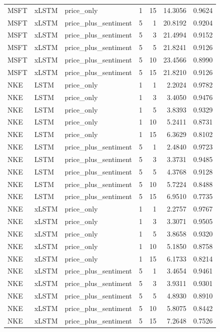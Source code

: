\begin{longtable}{lllrrrr}
MSFT & xLSTM & price_only & 1 & 15 & 14.3056 & 0.9624 \\
MSFT & xLSTM & price_plus_sentiment & 5 & 1 & 20.8192 & 0.9204 \\
MSFT & xLSTM & price_plus_sentiment & 5 & 3 & 21.4994 & 0.9152 \\
MSFT & xLSTM & price_plus_sentiment & 5 & 5 & 21.8241 & 0.9126 \\
MSFT & xLSTM & price_plus_sentiment & 5 & 10 & 23.4566 & 0.8990 \\
MSFT & xLSTM & price_plus_sentiment & 5 & 15 & 21.8210 & 0.9126 \\
NKE & LSTM & price_only & 1 & 1 & 2.2024 & 0.9782 \\
NKE & LSTM & price_only & 1 & 3 & 3.4050 & 0.9476 \\
NKE & LSTM & price_only & 1 & 5 & 3.8393 & 0.9329 \\
NKE & LSTM & price_only & 1 & 10 & 5.2411 & 0.8731 \\
NKE & LSTM & price_only & 1 & 15 & 6.3629 & 0.8102 \\
NKE & LSTM & price_plus_sentiment & 5 & 1 & 2.4840 & 0.9723 \\
NKE & LSTM & price_plus_sentiment & 5 & 3 & 3.3731 & 0.9485 \\
NKE & LSTM & price_plus_sentiment & 5 & 5 & 4.3768 & 0.9128 \\
NKE & LSTM & price_plus_sentiment & 5 & 10 & 5.7224 & 0.8488 \\
NKE & LSTM & price_plus_sentiment & 5 & 15 & 6.9510 & 0.7735 \\
NKE & xLSTM & price_only & 1 & 1 & 2.2757 & 0.9767 \\
NKE & xLSTM & price_only & 1 & 3 & 3.3071 & 0.9505 \\
NKE & xLSTM & price_only & 1 & 5 & 3.8658 & 0.9320 \\
NKE & xLSTM & price_only & 1 & 10 & 5.1850 & 0.8758 \\
NKE & xLSTM & price_only & 1 & 15 & 6.1733 & 0.8214 \\
NKE & xLSTM & price_plus_sentiment & 5 & 1 & 3.4654 & 0.9461 \\
NKE & xLSTM & price_plus_sentiment & 5 & 3 & 3.9311 & 0.9301 \\
NKE & xLSTM & price_plus_sentiment & 5 & 5 & 4.8930 & 0.8910 \\
NKE & xLSTM & price_plus_sentiment & 5 & 10 & 5.8075 & 0.8442 \\
NKE & xLSTM & price_plus_sentiment & 5 & 15 & 7.2648 & 0.7526 \\

\end{longtable}
